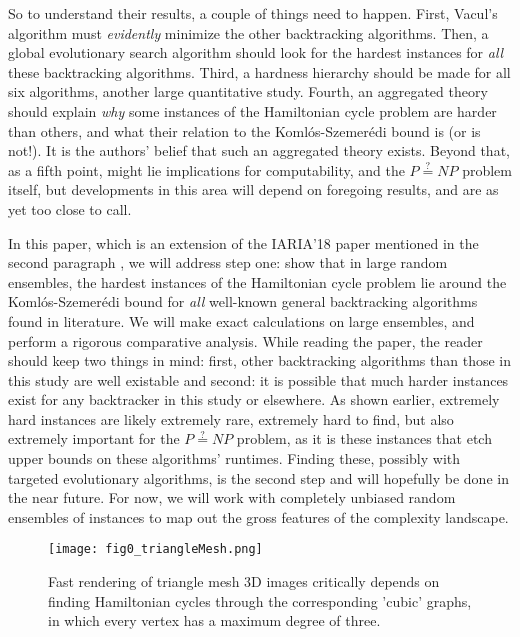 \documentclass[10pt,conference,compsocconf]{IEEEtran}
\begin{document}
So to understand their results, a couple of things need to happen. First, Vacul's algorithm must \textit{evidently} minimize the other backtracking algorithms. Then, a global evolutionary search algorithm should look for the hardest instances for \textit{all} these backtracking algorithms. Third, a hardness hierarchy should be made for all six algorithms, another large quantitative study. Fourth, an aggregated theory should explain \textit{why} some instances of the Hamiltonian cycle problem are harder than others, and what their relation to the Koml\'os-Szemer\'edi bound is (or is not!). It is the authors' belief that such an aggregated theory exists. Beyond that, as a fifth point, might lie implications for computability, and the $P\stackrel{?}{=}NP$ problem itself, but developments in this area will depend on foregoing results, and are as yet too close to call.

In this paper, which is an extension of the IARIA'18 paper mentioned in the second paragraph \cite{van2018predictive}, we will address step one: show that in large random ensembles, the hardest instances of the Hamiltonian cycle problem lie around the Koml\'os-Szemer\'edi bound for \textit{all} well-known general backtracking algorithms found in literature. We will make exact calculations on large ensembles, and perform a rigorous comparative analysis. While reading the paper, the reader should keep two things in mind: first, other backtracking algorithms than those in this study are well existable and second: it is possible that much harder instances exist for any backtracker in this study or elsewhere. As shown earlier, extremely hard instances are likely extremely rare, extremely hard to find, but also extremely important for the $P\stackrel{?}{=}NP$ problem, as it is these instances that etch upper bounds on  these algorithms' runtimes. Finding these, possibly with targeted evolutionary algorithms, is the second step and will hopefully be done in the near future. For now, we will work with completely unbiased random ensembles of instances to map out the gross features of the complexity landscape.

\begin{figure}[h]
\centering%
\texttt{[image: fig0\_triangleMesh.png]}
\caption{Fast rendering of triangle mesh 3D images critically depends on finding Hamiltonian cycles through the corresponding 'cubic' graphs, in which every vertex has a maximum degree of three.}\label{fig:trianglemesh}
\end{figure}
\end{document}
